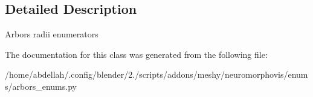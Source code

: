 \subsection{Detailed Description}


\begin{DoxyVerb}Arbors radii enumerators
\end{DoxyVerb}
 

The documentation for this class was generated from the following file\+:\begin{DoxyCompactItemize}
\item 
/home/abdellah/.\+config/blender/2./scripts/addons/meshy/neuromorphovis/enums/arbors\+\_\+enums.\+py\end{DoxyCompactItemize}
